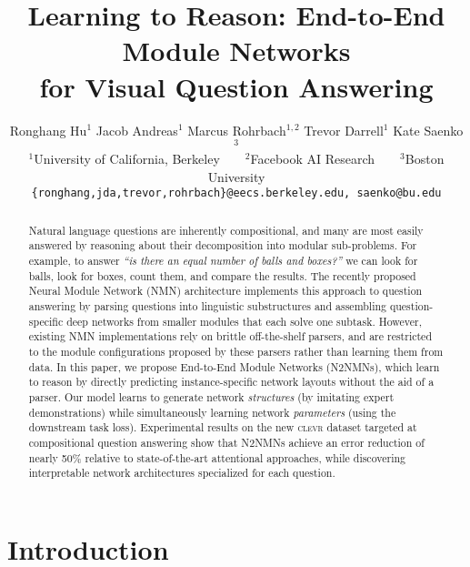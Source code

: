 \documentclass[10pt,twocolumn,letterpaper]{article}
\newcommand{\clevr}{\textsc{clevr}\xspace}
\begin{document}
\title{Learning to Reason: End-to-End Module Networks \\ for Visual Question Answering}

\author{Ronghang Hu$^1$ \quad Jacob Andreas$^1$ \quad Marcus Rohrbach$^{1,2}$ \quad Trevor Darrell$^1$ \quad Kate Saenko$^3$ \\
$^1$University of California, Berkeley$\qquad^2$Facebook AI Research$\qquad^3$Boston University \\
{\tt\small \{ronghang,jda,trevor,rohrbach\}@eecs.berkeley.edu, saenko@bu.edu}}

\maketitle
\thispagestyle{empty}


\begin{abstract} 
Natural language questions are inherently compositional, and many are most easily answered by reasoning about 
their decomposition into modular sub-problems. For example, to answer \emph{``is there an equal number of balls 
and boxes?''} we can look for balls, look for boxes, count them, and compare the results. The recently proposed 
Neural Module Network (NMN) architecture \cite{andreas16neural,andreas2016learning} implements this approach to question answering by parsing questions into linguistic substructures and assembling question-specific deep networks from smaller modules that each solve one subtask. However, existing NMN implementations rely on brittle off-the-shelf parsers, and are restricted to the module configurations proposed by these parsers rather than learning them from data. In this paper, we propose End-to-End Module Networks (N2NMNs), which learn to reason by directly predicting instance-specific network layouts without the aid of a parser. Our model learns to generate network \emph{structures} (by imitating expert demonstrations) while simultaneously learning network \emph{parameters} (using the downstream task loss). Experimental results on the new \clevr dataset targeted at compositional question answering show that N2NMNs achieve an error reduction of nearly 50\% relative to state-of-the-art attentional approaches, while discovering interpretable network architectures specialized for each question.
\end{abstract}

\section{Introduction}
\end{document}
